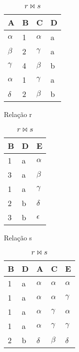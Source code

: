 \documentclass{article}
\begin{document}
\begin{table}[ht]
  \parbox{.30\linewidth}{
    \centering
    \begin{tabular}{|l|l|l|l|}
      \hline
      A        & B & C         & D \\ \hline
      $\alpha$ & 1 & $\alpha$  & a \\ \hline
      $\beta$  & 2 & $\gamma $ & a \\ \hline
      $\gamma$ & 4 & $\beta$   & b \\ \hline
      $\alpha$ & 1 & $\gamma$  & a \\ \hline
      $\delta$ & 2 & $\beta$   & b \\ \hline
    \end{tabular}
    \caption{Relação r}
  }
  \hfill
  \parbox{.30\linewidth}{
    \centering
    \begin{tabular}{|l|l|l|}
      \hline
      B & D & E          \\ \hline
      1 & a & $\alpha$   \\ \hline
      3 & a & $\beta$    \\ \hline
      1 & a & $\gamma$   \\ \hline
      2 & b & $\delta$   \\ \hline
      3 & b & $\epsilon$ \\ \hline
    \end{tabular}
    \caption{Relação s}
  }
  \hfill
  \parbox{.30\linewidth}{
    \centering
    \begin{tabular}{|l|l|l|l|l|}
      \hline
      B & D & A        & C        & E        \\ \hline
      1 & a & $\alpha$ & $\alpha$ & $\alpha$ \\ \hline
      1 & a & $\alpha$ & $\alpha$ & $\gamma$ \\ \hline
      1 & a & $\alpha$ & $\gamma$ & $\alpha$ \\ \hline
      1 & a & $\alpha$ & $\gamma$ & $\gamma$ \\ \hline
      2 & b & $\delta$ & $\beta$  & $\delta$ \\ \hline
    \end{tabular}
    \caption{$r \Join s$}
  }
\end{table}
\end{document}
